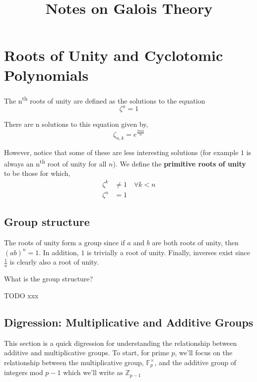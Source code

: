 \documentclass{article}
\begin{document}
\title{Notes on Galois Theory}
\maketitle

\section{Roots of Unity and Cyclotomic Polynomials}

The n\textsuperscript{th} roots of unity are defined as the solutions to the equation
\begin{equation}
\zeta^{n} = 1
\end{equation}

There are n solutions to this equation given by,
\begin{equation}
\zeta_{n, k} = e^{\frac{2 \pi i k}{n}}
\end{equation}

However, notice that some of these are less interesting solutions (for example $ 1 $ is always an n\textsuperscript{th} root of unity for all $n$). We define the \textbf{primitive roots of unity} to be those for which,
\begin{subequations}
\begin{align}
\zeta^{k} & \neq 1 \quad \forall k < n \\
\zeta^{n} & = 1
\end{align}
\end{subequations}

\subsection{Group structure}

The roots of unity form a group since if $a$ and $b$ are both roots of unity, then $(ab)^{n} = 1$. In addition, $1$ is trivially a root of unity. Finally, inverses exist since $\frac{1}{a}$ is clearly also a root of unity.

What is the group structure?

TODO xxx

\subsection{Digression: Multiplicative and Additive Groups}

This section is a quick digression for understanding the relationship between additive and multiplicative groups. To start, for prime $ p $, we'll focus on the relationship between the multiplicative group, $ \mathbb{F}_{p}^{\times} $, and the additive group of integers mod $ p - 1 $ which we'll write as $ \mathbb{Z}_{p-1} $
\end{document}
